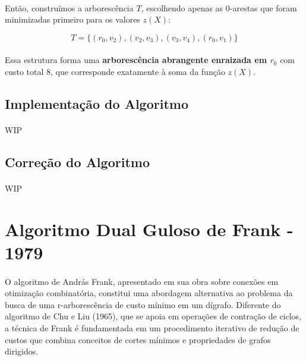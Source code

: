 \documentclass[12pt,a4paper]{article}
\begin{document}

\paragraph{}
Então, construímos a arborescência \( T \), escolhendo apenas as 0-arestas que foram minimizadas primeiro para os valores \( z(X) \):

\[
T = \{ (r_0, v_2), (v_2, v_3), (v_3, v_4), (r_0, v_1) \}
\]

\paragraph{}
Essa estrutura forma uma \textbf{arborescência abrangente enraizada em \( r_0 \)} com custo total 8, que corresponde exatamente à soma da função \( z(X) \).

\subsection{Implementação do Algoritmo}
\paragraph{}
WIP

\subsection{Correção do Algoritmo}
\paragraph{}
WIP

\section{Algoritmo Dual Guloso de Frank - 1979}
\paragraph{}
O algoritmo de András Frank, apresentado em sua obra sobre conexões em otimização combinatória, constitui uma abordagem alternativa ao problema da busca de uma r-arborescência de custo mínimo em um dígrafo. Diferente do algoritmo de Chu e Liu (1965), que se apoia em operações de contração de ciclos, a técnica de Frank é fundamentada em um procedimento iterativo de redução de custos que combina conceitos de cortes mínimos e propriedades de grafos dirigidos.
\end{document}
